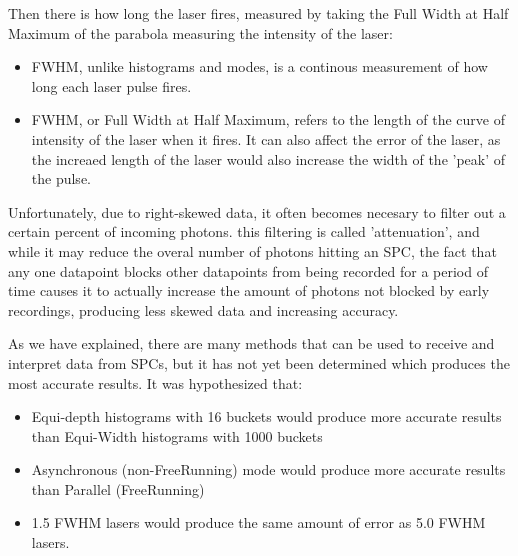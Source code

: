 \documentclass{article}
\begin{document}
Then there is how long the laser fires, measured by taking the Full Width at Half Maximum of the parabola measuring the intensity of the laser:
\begin{itemize}
\item FWHM, unlike histograms and modes, is a continous measurement of how long each laser pulse fires.
\item FWHM, or Full Width at Half Maximum, refers to the length of the curve of intensity of the laser when it fires. It can also affect the error of the laser, as the increaed length of the laser would also increase the width of the 'peak' of the pulse.
\end{itemize}

Unfortunately, due to right-skewed data, it often becomes necesary to filter out a certain percent of incoming photons. this filtering is called 'attenuation', \cite{ingle} and while it may reduce the overal number of photons hitting an SPC, the fact that any one datapoint blocks other datapoints from being recorded for a period of time causes it to actually increase the amount of photons not blocked by early recordings, producing less skewed  data and increasing accuracy.  \cite{sadekar}

As we have explained, there are many methods that can be used to receive and interpret data from SPCs, but it has not yet been determined which produces the most accurate results. It was hypothesized that:
\begin{itemize}
  \item Equi-depth histograms with 16 buckets would produce more accurate results than Equi-Width histograms with 1000 buckets
  \item Asynchronous (non-FreeRunning) mode would produce more accurate results than Parallel (FreeRunning)
  \item 1.5 FWHM lasers would produce the same amount of error as 5.0 FWHM lasers.
\end{itemize}
  
\end{document}
